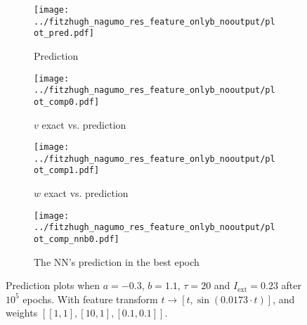 \documentclass[a4paper]{article}
\begin{document}
\begin{figure}[H]
	\centering 
	\begin{subfigure}[b]{0.47\textwidth}
		\centering
		\texttt{[image: ../fitzhugh\_nagumo\_res\_feature\_onlyb\_nooutput/plot\_pred.pdf]}
		\caption{Prediction}
		\label{fig:justb08a}
	\end{subfigure}
	\begin{subfigure}[b]{0.47\textwidth}
		\centering
		\texttt{[image: ../fitzhugh\_nagumo\_res\_feature\_onlyb\_nooutput/plot\_comp0.pdf]}
		\caption{$v$ exact vs. prediction}
		\label{fig:justb08b}
	\end{subfigure}
	\begin{subfigure}[b]{0.47\textwidth}
		\centering
		\texttt{[image: ../fitzhugh\_nagumo\_res\_feature\_onlyb\_nooutput/plot\_comp1.pdf]}
		\caption{$w$ exact vs. prediction}
		\label{fig:justb08c}
	\end{subfigure}
	\begin{subfigure}[b]{0.47\textwidth}
		\centering
		\texttt{[image: ../fitzhugh\_nagumo\_res\_feature\_onlyb\_nooutput/plot\_comp\_nnb0.pdf]}
		\caption{The NN's prediction in the best epoch}
		\label{fig:justb08d}
	\end{subfigure}
	\caption{Prediction plots when $a=-0.3$, $b=1.1$, $\tau=20$ and $ I_{\text{ext}}=0.23$ after $10^5$ epochs. With feature transform $t \rightarrow \left[ t, \sin(0.0173\cdot t) \right] $, and weights $\left[ \left[ 1, 1\right], \left[ 10, 1\right], \left[ 0.1, 0.1 \right]\right]$.}
	\label{plot:justb08}
\end{figure} 	
\end{document}
